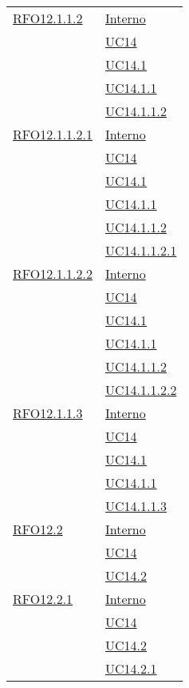 \begin{longtable}{|>{\centering}m{5cm}|m{5cm}<{\centering}|}
 \hyperlink{RFO12.1.1.2}{RFO12.1.1.2} 
 & \hyperlink{Interno}{Interno}\\
& \hyperref[UC14]{UC14}\\
& \hyperref[UC14.1]{UC14.1}\\
& \hyperref[UC14.1.1]{UC14.1.1}\\
& \hyperref[UC14.1.1.2]{UC14.1.1.2}\\\hline

 \hyperlink{RFO12.1.1.2.1}{RFO12.1.1.2.1} 
 & \hyperlink{Interno}{Interno}\\
& \hyperref[UC14]{UC14}\\
& \hyperref[UC14.1]{UC14.1}\\
& \hyperref[UC14.1.1]{UC14.1.1}\\
& \hyperref[UC14.1.1.2]{UC14.1.1.2}\\
& \hyperref[UC14.1.1.2.1]{UC14.1.1.2.1}\\\hline

\hyperlink{RFO12.1.1.2.2}{RFO12.1.1.2.2} 
 & \hyperlink{Interno}{Interno}\\
& \hyperref[UC14]{UC14}\\
& \hyperref[UC14.1]{UC14.1}\\
& \hyperref[UC14.1.1]{UC14.1.1}\\
& \hyperref[UC14.1.1.2]{UC14.1.1.2}\\
& \hyperref[UC14.1.1.2.2]{UC14.1.1.2.2}\\\hline

 \hyperlink{RFO12.1.1.3}{RFO12.1.1.3} 
 & \hyperlink{Interno}{Interno}\\
& \hyperref[UC14]{UC14}\\
& \hyperref[UC14.1]{UC14.1}\\
& \hyperref[UC14.1.1]{UC14.1.1}\\
& \hyperref[UC14.1.1.3]{UC14.1.1.3}\\\hline

 \hyperlink{RFO12.2}{RFO12.2} 
 & \hyperlink{Interno}{Interno}\\
& \hyperref[UC14]{UC14}\\
& \hyperref[UC14.2]{UC14.2}\\\hline

 \hyperlink{RFO12.2.1}{RFO12.2.1} 
 & \hyperlink{Interno}{Interno}\\
& \hyperref[UC14]{UC14}\\
& \hyperref[UC14.2]{UC14.2}\\
& \hyperref[UC14.2.1]{UC14.2.1}\\\hline


\end{longtable}
